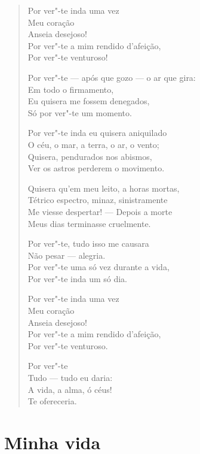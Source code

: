 \begin{verse}
Por ver"-te inda uma vez\\
\qquad Meu coração\\
\qquad Anseia desejoso!\\
Por ver"-te a mim rendido d'afeição,\\
Por ver"-te venturoso!

Por ver"-te --- após que gozo --- o ar que gira:\\
\qquad Em todo o firmamento,\\
Eu quisera me fossem denegados,\\
\qquad Só por ver"-te um momento.

Por ver"-te inda eu quisera aniquilado\\
O céu, o mar, a terra, o ar, o vento;\\
Quisera, pendurados nos abismos,\\
Ver os astros perderem o movimento.

Quisera qu'em meu leito, a horas mortas,\\
Tétrico espectro, minaz, sinistramente\\
Me viesse despertar! --- Depois a morte\\
Meus dias terminasse cruelmente.

Por ver"-te, tudo isso me causara\\
Não pesar --- alegria.\\
Por ver"-te uma só vez durante a vida,\\
\qquad Por ver"-te inda um só dia.

\pagebreak

Por ver"-te inda uma vez\\
\qquad Meu coração\\
\qquad Anseia desejoso!\\
Por ver"-te a mim rendido d'afeição,\\
Por ver"-te venturoso.

\qquad Por ver"-te\\
Tudo --- tudo eu daria:\\
A vida, a alma, ó céus!\\
\qquad Te ofereceria.
\end{verse}

\chapter{Minha vida}


